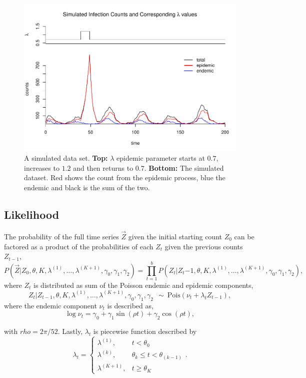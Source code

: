 \documentclass[11pt,a4paper]{article}
\begin{document}
\begin{figure}
\centering
\includegraphics{thesis_draft_files/figure-latex/simulation figure-1.pdf}
\caption{\label{fig:sim_data} A simulated data set. \textbf{Top:}
\(\lambda\) epidemic parameter starts at \(0.7\), increases to \(1.2\)
and then returns to \(0.7\). \textbf{Bottom:} The simulated dataset. Red
shows the count from the epidemic process, blue the endemic and black is
the sum of the two.}
\end{figure}

\hypertarget{likelihood}{%
\subsection{Likelihood}\label{likelihood}}

The probability of the full time series \(\vec{Z}\) given the initial
starting count \(Z_0\) can be factored as a product of the probabilities
of each \(Z_t\) given the previous counts \(Z_{t-1}\),
\[P(\vec{Z}|Z_0,\theta, K, \lambda^{(1)}, \dots, \lambda^{(K+1)}, \gamma_0, \gamma_1, \gamma_2 ) = \prod_{t=1}^b P(Z_t|Z_t{-1}, \theta, K, \lambda^{(1)}, \dots, \lambda^{(K+1)}, \gamma_0, \gamma_1, \gamma_2),\]
where \(Z_t\) is distributed as sum of the Poisson endemic and epidemic
components,
\[Z_t|Z_{t-1}, \theta, K, \lambda^{(1)}, \dots, \lambda^{(K+1)}, \gamma_0, \gamma_1, \gamma_2 \ \ \sim\ \text{Pois}(\nu_t + \lambda_tZ_{t-1}),\]
where the endemic component \(\nu_t\) is described as,
\[\log{\nu_t} = \gamma_0 +  \gamma_{1}\sin(\rho  t)+\gamma_{2}\cos(\rho  t),\]

with \(rho = 2\pi/52\). Lastly, \(\lambda_t\) is piecewise function
described by
\[ \lambda_t =  \begin{cases} \lambda^{(1)}, & t < \theta_0 \\
\lambda^{(k)}, & \theta_{k} \leq t < \theta_{(k-1)} \\
\lambda^{(K+1)}, & t \geq \theta_K \end{cases}.\]
\end{document}
